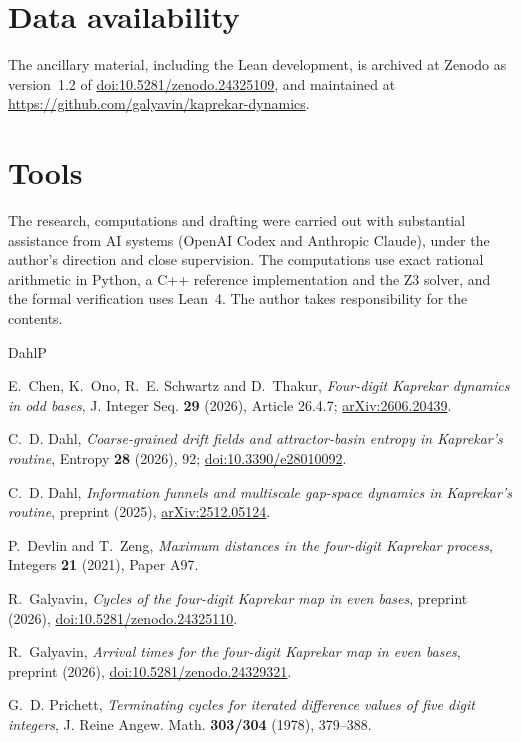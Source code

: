 \documentclass[11pt]{amsart}
\begin{document}
\section*{Data availability}
The ancillary material, including the Lean development, is archived at Zenodo as version~1.2 of \href{https://doi.org/10.5281/zenodo.24325109}{doi:10.5281/zenodo.24325109}, and maintained at \url{https://github.com/galyavin/kaprekar-dynamics}.

\section*{Tools}
The research, computations and drafting were carried out with substantial assistance from AI systems (OpenAI Codex and Anthropic Claude), under the author's direction and close supervision. The computations use exact rational arithmetic in Python, a C++ reference implementation and the Z3 solver, and the formal verification uses Lean~4. The author takes responsibility for the contents.

\begingroup\raggedright
\begin{thebibliography}{DahlP}

E.~Chen, K.~Ono, R.~E. Schwartz and D.~Thakur, \emph{Four-digit Kaprekar dynamics in odd bases}, J. Integer Seq. \textbf{29} (2026), Article 26.4.7; \href{https://arxiv.org/abs/2606.20439}{arXiv:2606.20439}.

C.~D. Dahl, \emph{Coarse-grained drift fields and attractor-basin entropy in Kaprekar's routine}, Entropy \textbf{28} (2026), 92; \href{https://doi.org/10.3390/e28010092}{doi:10.3390/e28010092}.

C.~D. Dahl, \emph{Information funnels and multiscale gap-space dynamics in Kaprekar's routine}, preprint (2025), \href{https://arxiv.org/abs/2512.05124}{arXiv:2512.05124}.

P.~Devlin and T.~Zeng, \emph{Maximum distances in the four-digit Kaprekar process}, Integers \textbf{21} (2021), Paper A97.

R.~Galyavin, \emph{Cycles of the four-digit Kaprekar map in even bases}, preprint (2026), \href{https://doi.org/10.5281/zenodo.24325110}{doi:10.5281/zenodo.24325110}.

R.~Galyavin, \emph{Arrival times for the four-digit Kaprekar map in even bases}, preprint (2026), \href{https://doi.org/10.5281/zenodo.24329321}{doi:10.5281/zenodo.24329321}.

G.~D. Prichett, \emph{Terminating cycles for iterated difference values of five digit integers}, J. Reine Angew. Math. \textbf{303/304} (1978), 379--388.

\end{thebibliography}
\endgroup
\end{document}
